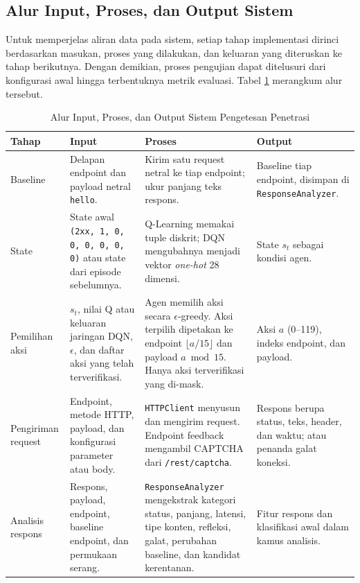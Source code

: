\subsection{Alur Input, Proses, dan Output Sistem}

Untuk memperjelas aliran data pada sistem, setiap tahap implementasi dirinci berdasarkan masukan, proses yang dilakukan, dan keluaran yang diteruskan ke tahap berikutnya. Dengan demikian, proses pengujian dapat ditelusuri dari konfigurasi awal hingga terbentuknya metrik evaluasi. Tabel \ref{tab:alur_input_output} merangkum alur tersebut.

\begin{table}[htbp]
\centering
\caption{Alur Input, Proses, dan Output Sistem Pengetesan Penetrasi}
\label{tab:alur_input_output}
\footnotesize
\setlength{\tabcolsep}{3pt}
\renewcommand{\arraystretch}{1.15}
\begin{tabularx}{\textwidth}{
>{\raggedright\arraybackslash}p{1.9cm}
>{\raggedright\arraybackslash}p{3.1cm}
>{\raggedright\arraybackslash}X
>{\raggedright\arraybackslash}p{2.6cm}}
\toprule
\textbf{Tahap} & \textbf{Input} & \textbf{Proses} & \textbf{Output} \\
\midrule
Baseline & Delapan endpoint dan payload netral \texttt{hello}. & Kirim satu request netral ke tiap endpoint; ukur panjang teks respons. & Baseline tiap endpoint, disimpan di \texttt{ResponseAnalyzer}. \\
\midrule
State & State awal \texttt{(2xx, 1, 0, 0, 0, 0, 0, 0)} atau state dari episode sebelumnya. & Q-Learning memakai tuple diskrit; DQN mengubahnya menjadi vektor \textit{one-hot} 28 dimensi. & State $s_t$ sebagai kondisi agen. \\
\midrule
Pemilihan aksi & $s_t$, nilai Q atau keluaran jaringan DQN, $\epsilon$, dan daftar aksi yang telah terverifikasi. & Agen memilih aksi secara $\epsilon$-greedy. Aksi terpilih dipetakan ke endpoint $\lfloor a/15\rfloor$ dan payload $a\bmod15$. Hanya aksi terverifikasi yang di-mask. & Aksi $a$ (0--119), indeks endpoint, dan payload. \\
\midrule
Pengiriman request & Endpoint, metode HTTP, payload, dan konfigurasi parameter atau body. & \texttt{HTTPClient} menyusun dan mengirim request. Endpoint feedback mengambil CAPTCHA dari \texttt{/rest/captcha}. & Respons berupa status, teks, header, dan waktu; atau penanda galat koneksi. \\
\midrule
Analisis respons & Respons, payload, endpoint, baseline endpoint, dan permukaan serang. & \texttt{ResponseAnalyzer} mengekstrak kategori status, panjang, latensi, tipe konten, refleksi, galat, perubahan baseline, dan kandidat kerentanan. & Fitur respons dan klasifikasi awal dalam kamus analisis. \\

\end{tabularx}
\end{table}
